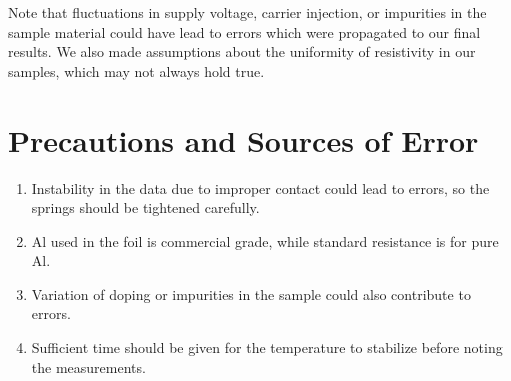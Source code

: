 Note that fluctuations in supply voltage, carrier injection, or impurities in the sample material could have lead to errors which were propagated to our final results. We also made assumptions about the uniformity of resistivity in our samples, which may not always hold true.

\section{Precautions and Sources of Error}

    \begin{enumerate}
        \item Instability in the data due to improper contact could lead to errors, so the springs should be tightened carefully.
        \item Al used in the foil is commercial grade, while standard resistance is for pure Al.
        \item Variation of doping or impurities in the sample could also contribute to errors.
        \item Sufficient time should be given for the temperature to stabilize before noting the measurements.
    \end{enumerate}
